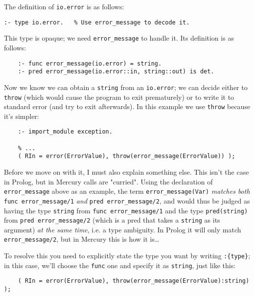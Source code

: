 The definition of \texttt{io.error} is as follows:

\begin{lstlisting}[language=Mercury]
	:- type io.error.   % Use error_message to decode it.
\end{lstlisting}

This type is opaque; we need \texttt{error\_message} to handle it. Its definition is as follows:

\begin{lstlisting}[language=Mercury]
	% Look up the error message corresponding to a particular error code.
	:- func error_message(io.error) = string.
	:- pred error_message(io.error::in, string::out) is det.
\end{lstlisting}

Now we know we can obtain a \texttt{string} from an \texttt{io.error}; we can decide either to \texttt{throw} (which would cause the program to exit prematurely) or to write it to standard error (and try to exit afterwards). In this example we use \texttt{throw} because it's simpler:

\begin{lstlisting}[language=Mercury]
	% throw/1 requires the exception module.
	:- import_module exception.
	
	% ...
	( RIn = error(ErrorValue), throw(error_message(ErrorValue)) );
\end{lstlisting}

Before we move on with it, I must also explain something else. This isn't the case in Prolog, but in Mercury calls are "curried". Using the declaration of \texttt{error\_message} above as an example, the term \texttt{error\_message(Var)} \emph{matches both} \texttt{func error\_message/1} \emph{and} \texttt{pred error\_message/2}, and would thus be judged as having the type \texttt{string} from \texttt{func error\_message/1} and the type \texttt{pred(string)} from \texttt{pred error\_message/2} (which is a pred that takes a \texttt{string} as its argument) \emph{at the same time}, i.e. a type ambiguity. In Prolog it will only match \texttt{error\_message/2}, but in Mercury this is how it is\ldots{}

To resolve this you need to explicitly state the type you want by writing \texttt{:\{type\}}; in this case, we'll choose the \texttt{func} one and specify it as \texttt{string}, just like this:

\begin{lstlisting}[language=Mercury]
	%                                here, the ":string" part. ---v
	( RIn = error(ErrorValue), throw(error_message(ErrorValue):string) );
\end{lstlisting}

